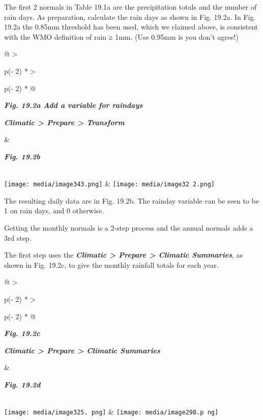 \documentclass[
  letterpaper,
  DIV=11,
  numbers=noendperiod]{scrreprt}
\begin{document}
The first 2 normals in Table 19.1a are the precipitation totals and the
number of rain days. As preparation, calculate the rain days as shown in
Fig. 19.2a. In Fig. 19.2a the 0.85mm threshold has been used, which we
claimed above, is consistent with the WMO definition of rain ≥ 1mm. (Use
0.95mm is you don't agree!)

\begin{longtable}[]{@{}
  >{\raggedright\arraybackslash}p{(\columnwidth - 2\tabcolsep) * }
  >{\raggedright\arraybackslash}p{(\columnwidth - 2\tabcolsep) * }@{}}
\toprule\noalign{}
\begin{minipage}[b]{\linewidth}\raggedright
\textbf{\emph{Fig. 19.2a Add a variable for raindays}}

\textbf{\emph{Climatic \textgreater{} Prepare \textgreater{} Transform}}
\end{minipage} & \begin{minipage}[b]{\linewidth}\raggedright
\textbf{\emph{Fig. 19.2b}}
\end{minipage} \\
\midrule\noalign{}
\endhead
\bottomrule\noalign{}
\endlastfoot
\texttt{[image: media/image343.png]} &
\texttt{[image: media/image32 2.png]} \\
\end{longtable}

The resulting daily data are in Fig. 19.2b. The rainday variable can be
seen to be 1 on rain days, and 0 otherwise.

Getting the monthly normals is a 2-step process and the annual normals
adds a 3rd step.

The first step uses the \textbf{\emph{Climatic \textgreater{} Prepare
\textgreater{} Climatic Summaries}}, as shown in Fig. 19.2c, to give the
monthly rainfall totals for each year.

\begin{longtable}[]{@{}
  >{\raggedright\arraybackslash}p{(\columnwidth - 2\tabcolsep) * }
  >{\raggedright\arraybackslash}p{(\columnwidth - 2\tabcolsep) * }@{}}
\toprule\noalign{}
\begin{minipage}[b]{\linewidth}\raggedright
\textbf{\emph{Fig. 19.2c}}

\textbf{\emph{Climatic \textgreater{} Prepare \textgreater{} Climatic
Summaries}}
\end{minipage} & \begin{minipage}[b]{\linewidth}\raggedright
\textbf{\emph{Fig. 19.2d}}
\end{minipage} \\
\midrule\noalign{}
\endhead
\bottomrule\noalign{}
\endlastfoot
\texttt{[image: media/image325. png]} &
\texttt{[image: media/image298.p ng]} \\
\end{longtable}
\end{document}
